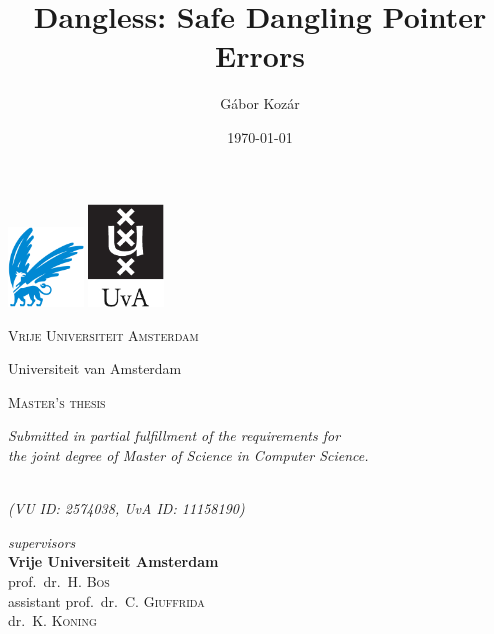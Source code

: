 \documentclass[12pt]{report}%
\title{Dangless: Safe Dangling Pointer Errors}
\author{Gábor Kozár}
\date{\today}
\begin{document}
\makeatletter
\begin{titlepage}
	\centering
	\includegraphics[width=0.15\textwidth, trim={0 0.15cm 0 0}, clip]{img/vu.png} \hspace{1.3cm}
	\includegraphics[width=0.15\textwidth, trim={0 0.74cm 0 0}, clip]{img/uva.eps}\par\vspace{1cm}
	{\scshape\huge Vrije Universiteit Amsterdam \par Universiteit van Amsterdam \par}

	\vspace{1.5cm}

	{\scshape\LARGE Master's thesis\par \par
		\vspace{0.2cm}
		\small \textit{Submitted in partial fulfillment of the requirements for\\ the joint degree of Master of Science in Computer Science.}\par}
	\vspace{1.5cm}

	{\Huge\bfseries \rm \textbf{\@title}\par}
	\vspace{1.5cm}

	{\Large\itshape\rm \noindent\textit{\@author}\\}
	\vspace{1mm}
	\textit{(VU ID: 2574038, UvA ID: 11158190)}
	\vfill

	\rm \noindent \textit{supervisors} \\ \vspace{0.15cm}
	\rm \textbf{Vrije Universiteit Amsterdam} \\
	prof.\ dr.\ H. \textsc{Bos} \\
	assistant prof.\ dr.\ C. \textsc{Giuffrida} \\
	dr.\ K. \textsc{Koning}
	\vfill
	
	{\large \@date\par}
\end{titlepage}
\makeatother
\end{document}
